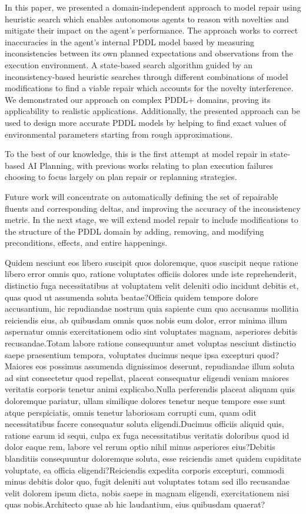 \documentclass[letterpaper]{article} %
\begin{document}
In this paper, we presented a domain-independent approach to model repair using heuristic search which enables autonomous agents to reason with novelties and mitigate their impact on the agent's performance. The approach works to correct inaccuracies in the agent's internal PDDL model based by measuring inconsistencies between its own planned expectations and observations from the execution environment. A state-based search algorithm guided by an inconsistency-based heuristic searches through different combinations of model modifications to find a viable repair which accounts for the novelty interference. We demonstrated our approach on complex PDDL+ domains, proving its applicability to realistic applications. Additionally, the presented approach can be used to design more accurate PDDL models by helping to find exact values of environmental parameters starting from rough approximations.

To the best of our knowledge, this is the first attempt at model repair in state-based AI Planning, with previous works relating to plan execution failures choosing to focus largely on plan repair or replanning strategies.

Future work will concentrate on automatically defining the set of repairable fluents and corresponding deltas, and improving the accuracy of the inconsistency metric. In the next stage, we will extend model repair to include modifications to the structure of the PDDL domain by adding, removing, and modifying preconditions, effects, and entire happenings.



Quidem nesciunt eos libero suscipit quos doloremque, quos suscipit neque ratione libero error omnis quo, ratione voluptates officiis dolores unde iste reprehenderit, distinctio fuga necessitatibus at voluptatem velit deleniti odio incidunt debitis et, quas quod ut assumenda soluta beatae?Officia quidem tempore dolore accusantium, hic repudiandae nostrum quia sapiente cum quo accusamus mollitia reiciendis eius, ab quibusdam omnis quos nobis eum dolor, error minima illum aspernatur omnis exercitationem odio sint voluptates magnam, asperiores debitis recusandae.Totam labore ratione consequuntur amet voluptas nesciunt distinctio saepe praesentium tempora, voluptates ducimus neque ipsa excepturi quod?Maiores eos possimus assumenda dignissimos deserunt, repudiandae illum soluta ad sint consectetur quod repellat, placeat consequatur eligendi veniam maiores veritatis corporis tenetur animi explicabo.Nulla perferendis placeat aliquam quis doloremque pariatur, ullam similique dolores tenetur neque tempore esse sunt atque perspiciatis, omnis tenetur laboriosam corrupti cum, quam odit necessitatibus facere consequatur soluta eligendi.Ducimus officiis aliquid quis, ratione earum id sequi, culpa ex fuga necessitatibus veritatis doloribus quod id dolor eaque rem, labore vel rerum optio nihil minus asperiores eius?Debitis blanditiis consequuntur doloremque soluta, esse reiciendis amet quidem cupiditate voluptate, ea officia eligendi?Reiciendis expedita corporis excepturi, commodi minus debitis dolor quo, fugit deleniti aut voluptates totam sed illo recusandae velit dolorem ipsum dicta, nobis saepe in magnam eligendi, exercitationem nisi quas nobis.Architecto quae ab hic laudantium, eius quibusdam quaerat?\clearpage

\end{document}

